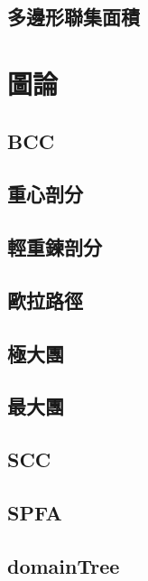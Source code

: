 \documentclass[a4paper,10pt,twocolumn,oneside]{article}
\begin{document}
\subsection{多邊形聯集面積}

%


\section{圖論}
\subsection{BCC}

\subsection{重心剖分}

\subsection{輕重鍊剖分}

\subsection{歐拉路徑}

\subsection{極大團}

\subsection{最大團}

\subsection{SCC}

\subsection{SPFA}

\subsection{domainTree} 

\end{document}
